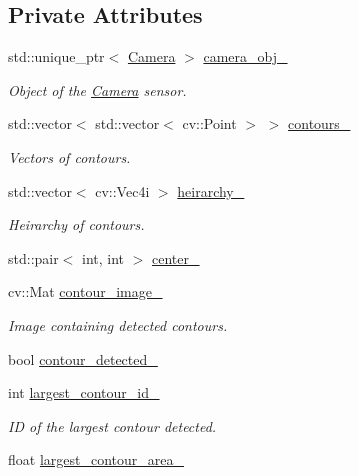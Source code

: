 \subsection*{Private Attributes}
\begin{DoxyCompactItemize}
\item 
std\+::unique\+\_\+ptr$<$ \hyperlink{class_camera}{Camera} $>$ \hyperlink{class_perception_module_af5250548d1ab0ab5574aa17fd99104e4}{camera\+\_\+obj\+\_\+}
\begin{DoxyCompactList}\small\item\em Object of the \hyperlink{class_camera}{Camera} sensor. \end{DoxyCompactList}\item 
std\+::vector$<$ std\+::vector$<$ cv\+::\+Point $>$ $>$ \hyperlink{class_perception_module_ae611b010af7c0351eb889165198ee82a}{contours\+\_\+}
\begin{DoxyCompactList}\small\item\em Vectors of contours. \end{DoxyCompactList}\item 
std\+::vector$<$ cv\+::\+Vec4i $>$ \hyperlink{class_perception_module_a1ed5ed9b4c99dd984e76c30f25754282}{heirarchy\+\_\+}
\begin{DoxyCompactList}\small\item\em Heirarchy of contours. \end{DoxyCompactList}\item 
std\+::pair$<$ int, int $>$ \hyperlink{class_perception_module_a67ea0e9f666e33bce8d81bf22098d168}{center\+\_\+}
\item 
cv\+::\+Mat \hyperlink{class_perception_module_a4c6044231fa94975cf299e5cd60ba447}{contour\+\_\+image\+\_\+}
\begin{DoxyCompactList}\small\item\em Image containing detected contours. \end{DoxyCompactList}\item 
bool \hyperlink{class_perception_module_ab547d968284f6ab18a01b9776c54f38a}{contour\+\_\+detected\+\_\+}
\item 
int \hyperlink{class_perception_module_a7936595913566cc046bcecfe3e9803d9}{largest\+\_\+contour\+\_\+id\+\_\+}
\begin{DoxyCompactList}\small\item\em ID of the largest contour detected. \end{DoxyCompactList}\item 
float \hyperlink{class_perception_module_aa20adfc7b4a473435fc98df6353b6fd6}{largest\+\_\+contour\+\_\+area\+\_\+}

\end{DoxyCompactItemize}
